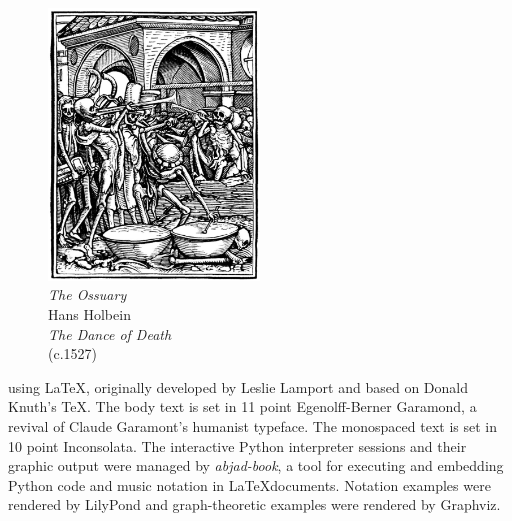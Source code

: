 \newpage

\begin{figure}
    \vspace{50pt}
    \centering
    \includegraphics[width=0.5\textwidth]{assets/holbein-ossuary.jpg}
    \\
    \emph{The Ossuary}
    \\
    Hans Holbein
    \\
    \emph{The Dance of Death}
    \\
    (c.1527)
\end{figure}

\begin{center}

\parbox{220pt}{

 using \LaTeX, originally developed by
Leslie Lamport and based on Donald Knuth's \TeX. The body text is set in 11
point Egenolff-Berner Garamond, a revival of Claude Garamont's humanist
typeface. The monospaced text is set in 10 point Inconsolata. The interactive
Python interpreter sessions and their graphic output were managed by
\emph{abjad-book}, a tool for executing and embedding Python code and music
notation in \LaTeX documents. Notation examples were rendered by LilyPond and
graph-theoretic examples were rendered by Graphviz.

}

\end{center}